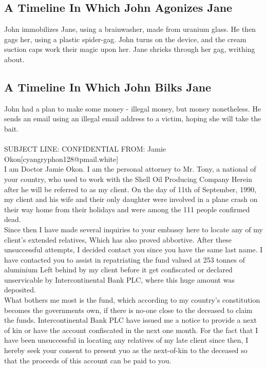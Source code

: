 \documentclass{article}
\begin{document}
\subsection{A Timeline In Which John Agonizes Jane}


John immobilizes Jane, using a brainwasher, made from uranium glass.
He then gags her, using a plastic spider{-}gag.
John turns on the device, and the cream suction caps work their magic upon her.
Jane shrieks through her gag, writhing about.
\subsection{A Timeline In Which John Bilks Jane}


John had a plan to make some money {-} illegal money, but money nonetheless.
He sends an email using an illegal email address to a victim, hoping she will take the bait.
\\\\
SUBJECT LINE: CONFIDENTIAL
FROM: Jamie Okon[cyangryphon128@pmail.white]
\\
I am Doctor Jamie Okon.
I am the personal attorney to Mr. Tony, a national of your country, who used to work with the Shell Oil Producing Company
Herein after he will be referred to as my client.
On the day of 11th of September, 1990, my client and his wife and their only daughter were involved in a plane crash on their way home from their holidays and were among the 111 people confirmed dead.
\\
Since then I have made several inquiries to your embassy here to locate any of my client's extended relatives, Which has also proved abbortive.
After these unsuccessful attempts, I decided contact you since you have the same last name.
I have contacted you to assist in repatriating the fund valued at 253 tonnes of aluminium Left behind by my client before it get confiscated or declared unservicable by Intercontinental Bank PLC, where this huge amount was deposited.
\\
What bothers me most is the fund, which according to my country's constitution becomes the governments own, if there is no{-}one close to the deceased to claim the funds.
Intercontinental Bank PLC have issued me a notice to provide a next of kin or have the account confiscated in the next one month.
For the fact that I have been unsuccessful in locating any relatives of my late client since then, I hereby seek your consent to present yuo as the next{-}of{-}kin to the deceased so that the proceeds of this account can be paid to you.
\end{document}
